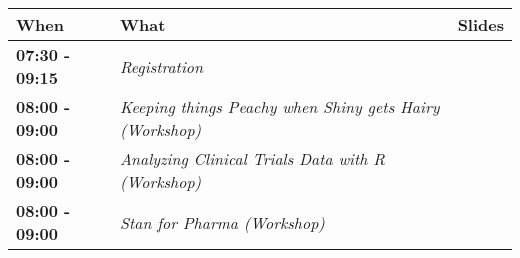 \documentclass[]{book}
\theoremstyle{definition}
\theoremstyle{definition}
\theoremstyle{definition}
\theoremstyle{remark}
\begin{document}
\begin{longtable}[]{@{}lll@{}}
\toprule
\begin{minipage}[b]{0.30\columnwidth}\raggedright
When\strut
\end{minipage} & \begin{minipage}[b]{0.30\columnwidth}\raggedright
What\strut
\end{minipage} & \begin{minipage}[b]{0.30\columnwidth}\raggedright
Slides\strut
\end{minipage}\tabularnewline
\midrule
\endhead
\begin{minipage}[t]{0.30\columnwidth}\raggedright
\textbf{07:30 - 09:15}\strut
\end{minipage} & \begin{minipage}[t]{0.30\columnwidth}\raggedright
\emph{Registration}\strut
\end{minipage} & \begin{minipage}[t]{0.30\columnwidth}\raggedright
\strut
\end{minipage}\tabularnewline
\begin{minipage}[t]{0.30\columnwidth}\raggedright
\textbf{08:00 - 09:00}\strut
\end{minipage} & \begin{minipage}[t]{0.30\columnwidth}\raggedright
\emph{Keeping things Peachy when Shiny gets Hairy (Workshop)}\strut
\end{minipage} & \begin{minipage}[t]{0.30\columnwidth}\raggedright
\strut
\end{minipage}\tabularnewline
\begin{minipage}[t]{0.30\columnwidth}\raggedright
\textbf{08:00 - 09:00}\strut
\end{minipage} & \begin{minipage}[t]{0.30\columnwidth}\raggedright
\emph{Analyzing Clinical Trials Data with R (Workshop)}\strut
\end{minipage} & \begin{minipage}[t]{0.30\columnwidth}\raggedright
\strut
\end{minipage}\tabularnewline
\begin{minipage}[t]{0.30\columnwidth}\raggedright
\textbf{08:00 - 09:00}\strut
\end{minipage} & \begin{minipage}[t]{0.30\columnwidth}\raggedright
\emph{Stan for Pharma (Workshop)}\strut
\end{minipage} & \begin{minipage}[t]{0.30\columnwidth}\raggedright

\end{minipage}
\end{longtable}
\end{document}
